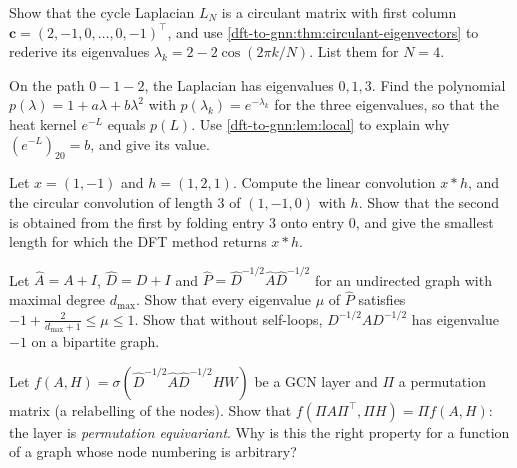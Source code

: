 \begin{notechapter}
\begin{exercise}\label{dft-to-gnn:exr:1}
Show that the cycle Laplacian $L_N$ is a circulant matrix with first column $\mathbf c = (2, -1, 0, \ldots, 0, -1)^\top$, and use \cref{dft-to-gnn:thm:circulant-eigenvectors} to rederive its eigenvalues $\lambda_k = 2 - 2\cos(2\pi k/N)$. List them for $N = 4$.
\end{exercise}

\begin{exercise}\label{dft-to-gnn:exr:2}
On the path $0 - 1 - 2$, the Laplacian has eigenvalues $0, 1, 3$. Find the polynomial $p(\lambda) = 1 + a\lambda + b\lambda^2$ with $p(\lambda_k) = e^{-\lambda_k}$ for the three eigenvalues, so that the heat kernel $e^{-L}$ equals $p(L)$. Use \cref{dft-to-gnn:lem:local} to explain why $(e^{-L})_{20} = b$, and give its value.
\end{exercise}

\begin{exercise}\label{dft-to-gnn:exr:3}
Let $x = (1, -1)$ and $h = (1, 2, 1)$. Compute the linear convolution $x * h$, and the circular convolution of length $3$ of $(1, -1, 0)$ with $h$. Show that the second is obtained from the first by folding entry $3$ onto entry $0$, and give the smallest length for which the DFT method returns $x*h$.
\end{exercise}

\begin{exercise}\label{dft-to-gnn:exr:4}
Let $\hat A = A + I$, $\hat D = D + I$ and $\hat P = \hat D^{-1/2}\hat A\hat D^{-1/2}$ for an undirected graph with maximal degree $d_{\max}$. Show that every eigenvalue $\mu$ of $\hat P$ satisfies $-1 + \frac{2}{d_{\max}+1} \le \mu \le 1$. Show that without self-loops, $D^{-1/2}AD^{-1/2}$ has eigenvalue $-1$ on a bipartite graph.
\end{exercise}

\begin{exercise}\label{dft-to-gnn:exr:5}
Let $f(A, H) = \sigma(\hat D^{-1/2}\hat A\hat D^{-1/2}HW)$ be a GCN layer and $\Pi$ a permutation matrix (a relabelling of the nodes). Show that $f(\Pi A\Pi^\top, \Pi H) = \Pi f(A, H)$: the layer is \emph{permutation equivariant}. Why is this the right property for a function of a graph whose node numbering is arbitrary?
\end{exercise}
\end{notechapter}
